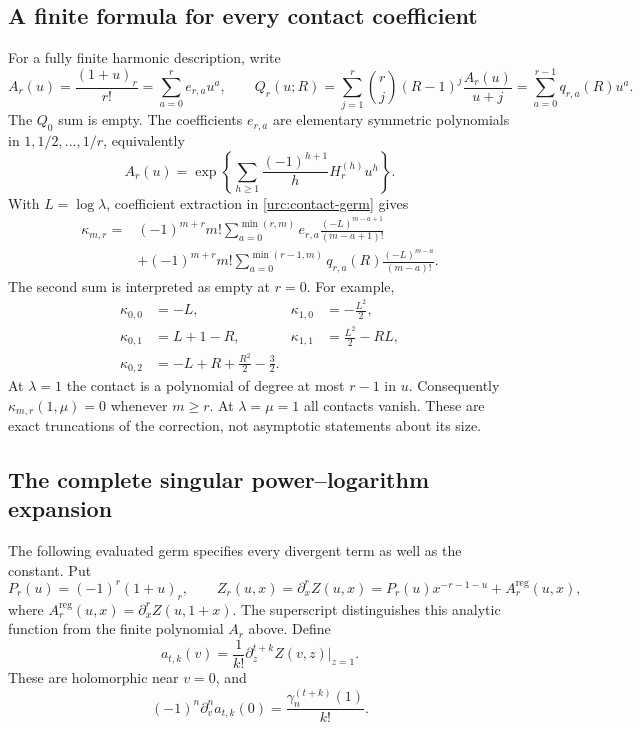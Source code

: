\documentclass[11pt,a4paper]{article}
\theoremstyle{definition}
\theoremstyle{remark}
\numberwithin{equation}{section}
\begin{document}
\subsection{A finite formula for every contact coefficient}

For a fully finite harmonic description, write
\[
 A_r(u)=\frac{(1+u)_r}{r!}
       =\sum_{a=0}^r e_{r,a}u^a,
 \qquad
 Q_r(u;R)=\sum_{j=1}^r\binom rj(R-1)^j\frac{A_r(u)}{u+j}
       =\sum_{a=0}^{r-1}q_{r,a}(R)u^a.
\]
The $Q_0$ sum is empty. The coefficients $e_{r,a}$ are elementary
symmetric polynomials in $1,1/2,\ldots,1/r$, equivalently
\begin{equation}\label{urc:harmonic-generator}
 A_r(u)=\exp\left\{\sum_{h\ge1}
        \frac{(-1)^{h+1}}h H_r^{(h)}u^h\right\}.
\end{equation}
With $L=\log\lambda$, coefficient extraction in
\eqref{urc:contact-germ} gives
\begin{equation}\label{urc:finite-coefficients}
 \begin{aligned}
 \kappa_{m,r}={}&(-1)^{m+r}m!
 \sum_{a=0}^{\min(r,m)}e_{r,a}
          \frac{(-L)^{m-a+1}}{(m-a+1)!}\\
 &+(-1)^{m+r}m!
 \sum_{a=0}^{\min(r-1,m)}q_{r,a}(R)
          \frac{(-L)^{m-a}}{(m-a)!}.
 \end{aligned}
\end{equation}
The second sum is interpreted as empty at $r=0$. For example,
\begin{align*}
 \kappa_{0,0}&=-L,&
 \kappa_{1,0}&=-\frac{L^2}{2},\\
 \kappa_{0,1}&=L+1-R,&
 \kappa_{1,1}&=\frac{L^2}{2}-RL,\\
 \kappa_{0,2}&=-L+R+\frac{R^2}{2}-\frac32.
\end{align*}
At $\lambda=1$ the contact is a polynomial of degree at most $r-1$
in $u$. Consequently $\kappa_{m,r}(1,\mu)=0$ whenever $m\ge r$.
At $\lambda=\mu=1$ all contacts vanish. These are exact truncations
of the correction, not asymptotic statements about its size.

\subsection{The complete singular power--logarithm expansion}

The following evaluated germ specifies every divergent term as well
as the constant. Put
\begin{equation}\label{urc:local-decomposition}
 P_r(u)=(-1)^r(1+u)_r,\qquad
 Z_r(u,x)=\partial_x^r Z(u,x)
         =P_r(u)x^{-r-1-u}+A_r^{\mathrm{reg}}(u,x),
\end{equation}
where $A_r^{\mathrm{reg}}(u,x)=\partial_x^r Z(u,1+x)$.
The superscript distinguishes this analytic function from the finite
polynomial $A_r$ above. Define
\begin{equation}\label{urc:analytic-coefficients}
 a_{t,k}(v)=\frac1{k!}\partial_z^{t+k}Z(v,z)\big|_{z=1}.
\end{equation}
These are holomorphic near $v=0$, and
\[
 (-1)^n\partial_v^n a_{t,k}(0)
      =\frac{\gamma_n^{(t+k)}(1)}{k!}.
\]
\end{document}
